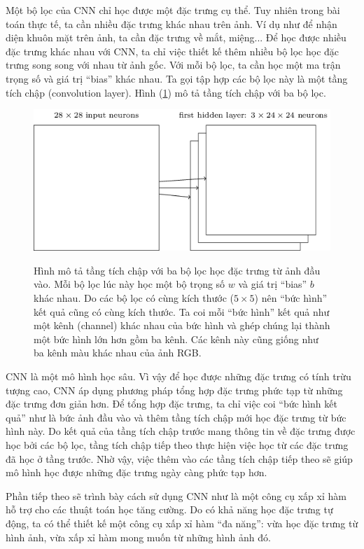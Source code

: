 	Một bộ lọc của CNN chỉ học được một đặc trưng cụ thể.
	Tuy nhiên trong bài toán thực tế, ta cần nhiều đặc trưng khác nhau trên ảnh.
	Ví dụ như để nhận diện khuôn mặt trên ảnh, ta cần đặc trưng về mắt, miệng...
	Để học được nhiều đặc trưng khác nhau với CNN, ta chỉ việc thiết kế thêm nhiều bộ lọc học đặc trưng song song với nhau từ ảnh gốc.
	Với mỗi bộ lọc, ta cần học một ma trận trọng số và giá trị ``bias'' khác nhau.
	Ta gọi tập hợp các bộ lọc này là một tầng tích chập (convolution layer).
	Hình (\ref{fig_cnn_layer}) mô tả tầng tích chập với ba bộ lọc.
	\begin{figure}
		\centering
		\includegraphics[width=\textwidth]{cnn_layer}
		\label{fig_cnn_layer}
		\caption[Tầng tích chập với ba bộ lọc]{Hình mô tả tầng tích chập với ba bộ lọc học đặc trưng từ ảnh đầu vào.
		Mỗi bộ lọc lúc này học một bộ trọng số $w$ và giá trị ``bias'' $b$ khác nhau.
		Do các bộ lọc có cùng kích thước ($5\times5$) nên ``bức hình'' kết quả cũng có cùng kích thước.
		Ta coi mỗi ``bức hình'' kết quả như một kênh (channel) khác nhau của bức hình và ghép chúng lại thành một bức hình lớn hơn gồm ba kênh.
		Các kênh này cũng giống như ba kênh màu khác nhau của ảnh RGB.}		
	\end{figure}
	
	CNN là một mô hình học sâu.
	Vì vậy để học được những đặc trưng có tính trừu tượng cao, CNN áp dụng phương pháp tổng hợp đặc trưng phức tạp từ những đặc trưng đơn giản hơn.
	Để tổng hợp đặc trưng, ta chỉ việc coi ``bức hình kết quả'' như là bức ảnh đầu vào và thêm tầng tích chập mới học đặc trưng từ bức hình này.
	Do kết quả của tầng tích chập trước mang thông tin về đặc trưng được học bởi các bộ lọc, tầng tích chập tiếp theo thực hiện việc học từ các đặc trưng đã học ở tầng trước.
	Nhờ vậy, việc thêm vào các tầng tích chập tiếp theo sẽ giúp mô hình học được những đặc trưng ngày càng phức tạp hơn.
	
	Phần tiếp theo sẽ trình bày cách sử dụng CNN như là một công cụ xấp xỉ hàm hỗ trợ cho các thuật toán học tăng cường.
	Do có khả năng học đặc trưng tự động, ta có thể thiết kế một công cụ xấp xỉ hàm ``đa năng'': vừa học đặc trưng từ hình ảnh, vừa xấp xỉ hàm mong muốn từ những hình ảnh đó.

